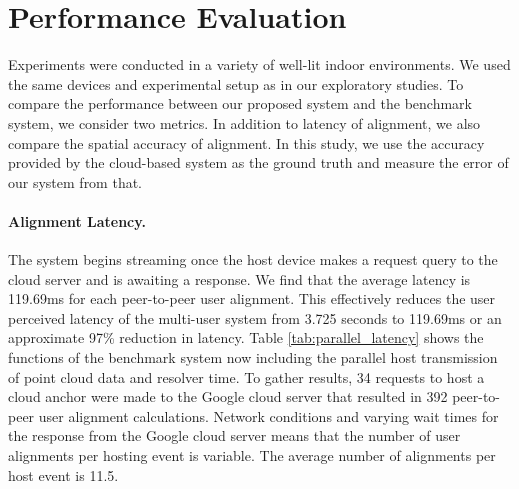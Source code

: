 \documentclass{vgtc}                          %
\begin{document}
\section{Performance Evaluation}\label{ExperimentalResults}

Experiments were conducted in a variety of well-lit indoor environments. We used the same devices and experimental setup as in our exploratory studies.  To compare the performance between our proposed system and the benchmark system, we consider two metrics. In addition to latency of alignment, we also compare the spatial accuracy of alignment. In this study, we use the accuracy provided by the cloud-based system as the ground truth and measure the error of our system from that. 

\paragraph{\bf Alignment Latency.}
The system begins streaming 
once the host device makes a request query to the cloud server and is awaiting a response. We 
find that the average latency is 119.69ms for each peer-to-peer user alignment. This effectively 
reduces the user perceived latency of the multi-user system from 3.725 seconds to 119.69ms or an approximate 97\% reduction in latency. Table 
\ref{tab:parallel_latency} shows the functions of the benchmark system now including the parallel host transmission of point cloud 
data and resolver time. To gather results, 34 requests to host a cloud anchor were made to the Google cloud server that 
resulted in 392 peer-to-peer user alignment calculations. Network conditions and varying wait times for the response from 
the Google cloud server means that the number of user alignments per hosting event is variable. The average 
number of alignments per host event is 11.5. %


\end{document}
